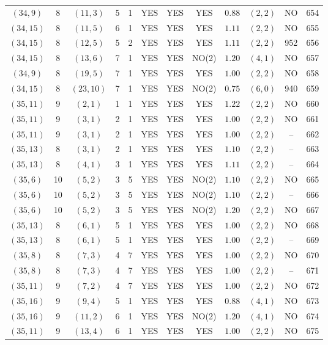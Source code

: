 \begin{longtable}{|c|c|c|c|c|c|c|c|c|c|c|c|}
$(34,9)$ & 8 & $(11,3)$ & 5 & 1 & YES & YES & YES & $0.88$ & $(2,2)$ & NO & 654\\
$(34,15)$ & 8 & $(11,5)$ & 6 & 1 & YES & YES & YES & $1.11$ & $(2,2)$ & NO & 655\\
$(34,15)$ & 8 & $(12,5)$ & 5 & 2 & YES & YES & YES & $1.11$ & $(2,2)$ & 952 & 656\\
$(34,15)$ & 8 & $(13,6)$ & 7 & 1 & YES & YES & NO(2) & $1.20$ & $(4,1)$ & NO & 657\\
$(34,9)$ & 8 & $(19,5)$ & 7 & 1 & YES & YES & YES & $1.00$ & $(2,2)$ & NO & 658\\
$(34,15)$ & 8 & $(23,10)$ & 7 & 1 & YES & YES & NO(2) & $0.75$ & $(6,0)$ & 940 & 659\\
$(35,11)$ & 9 & $(2,1)$ & 1 & 1 & YES & YES & YES & $1.22$ & $(2,2)$ & NO & 660\\
$(35,11)$ & 9 & $(3,1)$ & 2 & 1 & YES & YES & YES & $1.00$ & $(2,2)$ & NO & 661\\
$(35,11)$ & 9 & $(3,1)$ & 2 & 1 & YES & YES & YES & $1.00$ & $(2,2)$ & -- & 662\\
$(35,13)$ & 8 & $(3,1)$ & 2 & 1 & YES & YES & YES & $1.10$ & $(2,2)$ & -- & 663\\
$(35,13)$ & 8 & $(4,1)$ & 3 & 1 & YES & YES & YES & $1.11$ & $(2,2)$ & -- & 664\\
$(35,6)$ & 10 & $(5,2)$ & 3 & 5 & YES & YES & NO(2) & $1.10$ & $(2,2)$ & NO & 665\\
$(35,6)$ & 10 & $(5,2)$ & 3 & 5 & YES & YES & NO(2) & $1.10$ & $(2,2)$ & -- & 666\\
$(35,6)$ & 10 & $(5,2)$ & 3 & 5 & YES & YES & NO(2) & $1.20$ & $(2,2)$ & NO & 667\\
$(35,13)$ & 8 & $(6,1)$ & 5 & 1 & YES & YES & YES & $1.00$ & $(2,2)$ & NO & 668\\
$(35,13)$ & 8 & $(6,1)$ & 5 & 1 & YES & YES & YES & $1.00$ & $(2,2)$ & -- & 669\\
$(35,8)$ & 8 & $(7,3)$ & 4 & 7 & YES & YES & YES & $1.00$ & $(2,2)$ & NO & 670\\
$(35,8)$ & 8 & $(7,3)$ & 4 & 7 & YES & YES & YES & $1.00$ & $(2,2)$ & -- & 671\\
$(35,11)$ & 9 & $(7,2)$ & 4 & 7 & YES & YES & YES & $1.00$ & $(2,2)$ & NO & 672\\
$(35,16)$ & 9 & $(9,4)$ & 5 & 1 & YES & YES & YES & $0.88$ & $(4,1)$ & NO & 673\\
$(35,16)$ & 9 & $(11,2)$ & 6 & 1 & YES & YES & NO(2) & $1.20$ & $(4,1)$ & NO & 674\\
$(35,11)$ & 9 & $(13,4)$ & 6 & 1 & YES & YES & YES & $1.00$ & $(2,2)$ & NO & 675\\

\end{longtable}
